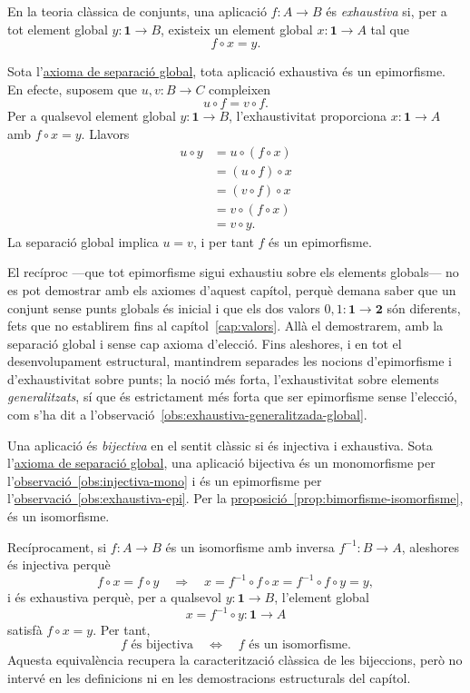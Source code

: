 \begin{observacio}\label{obs:exhaustiva-epi}
En la teoria clàssica de conjunts, una aplicació \(f:A\to B\) és \emph{exhaustiva} si, per a tot element global \(y:\mathbf1\to B\), existeix un element global \(x:\mathbf1\to A\) tal que
\[
f\circ x=y.
\]

Sota l'\hyperref[ax:separacio-globals]{axioma de separació global}, tota aplicació exhaustiva és un epimorfisme. En efecte, suposem que \(u,v:B\to C\) compleixen
\[
u\circ f=v\circ f.
\]
Per a qualsevol element global \(y:\mathbf1\to B\), l'exhaustivitat proporciona \(x:\mathbf1\to A\) amb \(f\circ x=y\). Llavors
\[
\begin{aligned}
u\circ y
&=u\circ(f\circ x)\\
&=(u\circ f)\circ x\\
&=(v\circ f)\circ x\\
&=v\circ(f\circ x)\\
&=v\circ y.
\end{aligned}
\]
La separació global implica \(u=v\), i per tant \(f\) és un epimorfisme.

El recíproc ---que tot epimorfisme sigui exhaustiu sobre els elements globals--- no es pot demostrar amb els axiomes d'aquest capítol, perquè demana saber que un conjunt sense punts globals és inicial i que els dos valors \(0,1\colon\mathbf1\to\mathbf2\) són diferents, fets que no establirem fins al capítol~\ref{cap:valors}. Allà el demostrarem, amb la separació global i sense cap axioma d'elecció. Fins aleshores, i en tot el desenvolupament estructural, mantindrem separades les nocions d'epimorfisme i d'exhaustivitat sobre punts; la noció més forta, l'exhaustivitat sobre elements \emph{generalitzats}, sí que és estrictament més forta que ser epimorfisme sense l'elecció, com s'ha dit a l'observació~\ref{obs:exhaustiva-generalitzada-global}.
\end{observacio}

\begin{observacio}\label{obs:bijectiva-iso}
Una aplicació és \emph{bijectiva} en el sentit clàssic si és injectiva i exhaustiva. Sota l'\hyperref[ax:separacio-globals]{axioma de separació global}, una aplicació bijectiva és un monomorfisme per l'\hyperref[obs:injectiva-mono]{observació~\ref*{obs:injectiva-mono}} i és un epimorfisme per l'\hyperref[obs:exhaustiva-epi]{observació~\ref*{obs:exhaustiva-epi}}. Per la \hyperref[prop:bimorfisme-isomorfisme]{proposició~\ref*{prop:bimorfisme-isomorfisme}}, és un isomorfisme.

Recíprocament, si \(f:A\to B\) és un isomorfisme amb inversa \(f^{-1}:B\to A\), aleshores és injectiva perquè
\[
f\circ x=f\circ y
\quad\Longrightarrow\quad
x=f^{-1}\circ f\circ x=f^{-1}\circ f\circ y=y,
\]
i és exhaustiva perquè, per a qualsevol \(y:\mathbf1\to B\), l'element global
\[
x=f^{-1}\circ y:\mathbf1\to A
\]
satisfà \(f\circ x=y\). Per tant,
\[
\boxed{
 f\text{ és bijectiva}
 \quad\Longleftrightarrow\quad
 f\text{ és un isomorfisme}.
}
\]
Aquesta equivalència recupera la caracterització clàssica de les bijeccions, però no intervé en les definicions ni en les demostracions estructurals del capítol.
\end{observacio}

